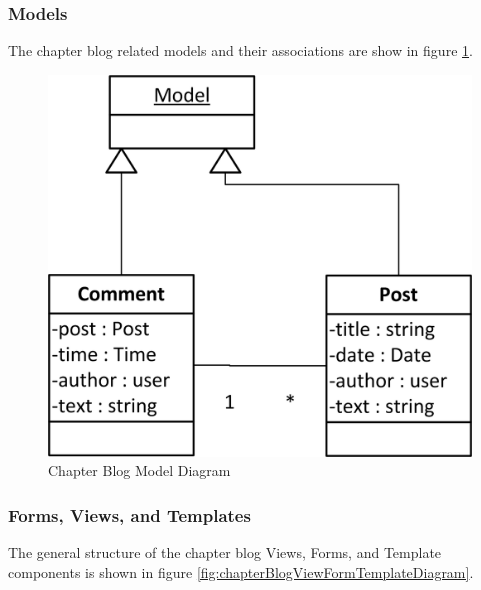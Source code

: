 \documentclass{article}
\begin{document}
\subsubsection{Models}

The chapter blog related models and their associations are show in figure \ref{fig:blogModelDiagram}.

\FloatBarrier
\begin{figure}[h!]
\centering
\includegraphics[scale=.65]{img/modelDiagrams/blogModel}
\caption{Chapter Blog Model Diagram}
\label{fig:blogModelDiagram}
\end{figure}
\FloatBarrier

\subsubsection{Forms, Views, and Templates}

The general structure of the chapter blog Views, Forms, and Template components is shown in figure \ref{fig:chapterBlogViewFormTemplateDiagram}.
\end{document}
